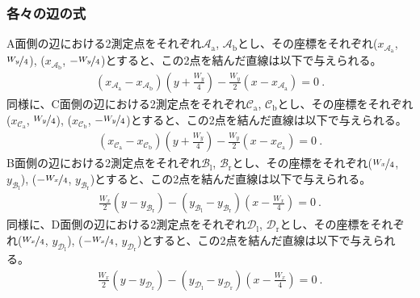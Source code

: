 \subsubsection{各々の辺の式}
A面側の辺における2測定点をそれぞれ$\mathcal A_\mathrm a$, $\mathcal A_\mathrm b$とし、その座標をそれぞれ($x_{\mathcal A_\mathrm a}$, $\nicefrac{W_y}4$), ($x_{\mathcal A_\mathrm b}$, $-\nicefrac{W_y}4$)とすると、この2点を結んだ直線は以下で与えられる。
\begin{align*}
  \left(x_{\mathcal A_\mathrm a}-x_{\mathcal A_\mathrm b}\right)\left(y+\frac{W_y}4\right)
  -\frac{W_y}2\left(x-x_{\mathcal A_\mathrm a}\right)
  = 0\ .
\end{align*}
同様に、C面側の辺における2測定点をそれぞれ$\mathcal C_\mathrm a$, $\mathcal C_\mathrm b$とし、その座標をそれぞれ($x_{\mathcal C_\mathrm a}$, $\nicefrac{W_y}4$), ($x_{\mathcal C_\mathrm b}$, $-\nicefrac{W_y}4$)とすると、この2点を結んだ直線は以下で与えられる。
\begin{align*}
  \left(x_{\mathcal C_\mathrm a}-x_{\mathcal C_\mathrm b}\right)\left(y+\frac{W_y}4\right)
  -\frac{W_y}2\left(x-x_{\mathcal C_\mathrm a}\right)
  = 0\ .
\end{align*}
B面側の辺における2測定点をそれぞれ$\mathcal B_\mathrm l$, $\mathcal B_\mathrm r$とし、その座標をそれぞれ($\nicefrac{W_x}4$, $y_{\mathcal B_\mathrm l}$), ($-\nicefrac{W_x}4$, $y_{\mathcal B_\mathrm r}$)とすると、この2点を結んだ直線は以下で与えられる。
\begin{align*}
  \frac{W_x}2\left(y-y_{\mathcal B_\mathrm r}\right)
  -\left(y_{\mathcal B_\mathrm l}-y_{\mathcal B_\mathrm r}\right)\left(x-\frac{W_x}4\right)
  = 0\ .
\end{align*}
同様に、D面側の辺における2測定点をそれぞれ$\mathcal D_\mathrm l$, $\mathcal D_\mathrm r$とし、その座標をそれぞれ($\nicefrac{W_x}4$, $y_{\mathcal D_\mathrm l}$), ($-\nicefrac{W_x}4$, $y_{\mathcal D_\mathrm r}$)とすると、この2点を結んだ直線は以下で与えられる。
\begin{align*}
  \frac{W_x}2\left(y-y_{\mathcal D_\mathrm r}\right)
  -\left(y_{\mathcal D_\mathrm l}-y_{\mathcal D_\mathrm r}\right)\left(x-\frac{W_x}4\right)
  = 0\ .
\end{align*}

\clearpage
